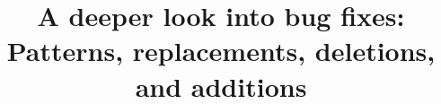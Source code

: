 \documentclass{sig-alternate-05-2015}
\begin{document}






%

\title{A deeper look into bug fixes: Patterns, replacements, deletions, and additions}

%
%
%
%
%
\end{document}
